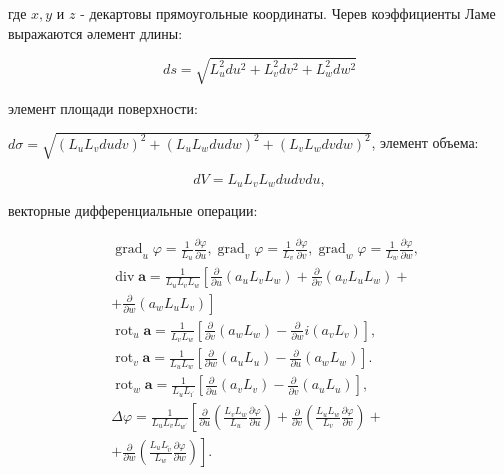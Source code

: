 \documentclass[10pt]{article}
\begin{document}
где $x, y$ и $z$ - декартовы прямоугольные координаты. Черев коэффициенты Ламе выражаются әлемент длины:

\[
d s=\sqrt{L_{u}^{2} d u^{2}+L_{v}^{2} d v^{2}+L_{w}^{2} d w^{2}}
\]

элемент площади поверхности:

$d \sigma=\sqrt{\left(L_{u} L_{v} d u d v\right)^{2}+\left(L_{u} L_{w} d u d w\right)^{2}+\left(L_{v} L_{w} d v d w\right)^{2}}$, элемент объема:

\[
d V=L_{u} L_{v} L_{w} d u d v d u,
\]

векторные дифференциальные операции:

\[
\begin{aligned}
& \operatorname{grad}_{u} \varphi=\frac{1}{L_{u}} \frac{\partial \varphi}{\partial u}, \operatorname{grad}_{v} \varphi=\frac{1}{L_{v}} \frac{\partial \varphi}{\partial v}, \operatorname{grad}_{w} \varphi=\frac{1}{L_{w}} \frac{\partial \varphi}{\partial w}, \\
& \operatorname{div} \boldsymbol{a}=\frac{1}{L_{u} L_{v} L_{w}}\left[\frac{\partial}{\partial u}\left(a_{u} L_{v} L_{w}\right)+\frac{\partial}{\partial v}\left(a_{v} L_{u} L_{w}\right)+\right. \\
& \left.+\frac{\partial}{\partial w}\left(a_{w} L_{u} L_{v}\right)\right] \\
& \operatorname{rot}_{u} \boldsymbol{a}=\frac{1}{L_{v} L_{w}}\left[\frac{\partial}{\partial v}\left(a_{w} L_{w}\right)-\frac{\partial}{\partial w} i\left(a_{v} L_{v}\right)\right], \\
& \operatorname{rot}_{v} \boldsymbol{a}=\frac{1}{L_{u} L_{w}}\left[\frac{\partial}{\partial w}\left(a_{u} L_{u}\right)-\frac{\partial}{\partial u}\left(a_{w} L_{w}\right)\right] \text {. } \\
& \operatorname{rot}_{w} \boldsymbol{a}=\frac{1}{L_{u} L_{\imath^{\prime}}}\left[\frac{\partial}{\partial u}\left(a_{v} L_{v}\right)-\frac{\partial}{\partial v}\left(a_{u} L_{u}\right)\right], \\
& \Delta \varphi=\frac{1}{L_{u} L_{v} L_{w^{\prime}}}\left[\frac{\partial}{\partial u}\left(\frac{L_{v} L_{w}}{L_{u}} \frac{\partial \varphi}{\partial u}\right)+\frac{\partial}{\partial v}\left(\frac{L_{u} L_{w}}{L_{v}} \frac{\partial \varphi}{\partial v}\right)+\right. \\
& \left.+\frac{\partial}{\partial w}\left(\frac{L_{u} L_{\tilde{v}}}{L_{w}} \frac{\partial \varphi}{\partial w}\right)\right] \text {. }
\end{aligned}
\]
\end{document}
